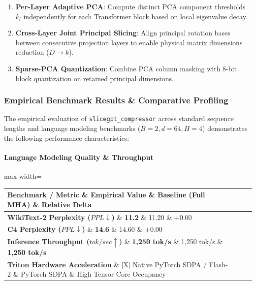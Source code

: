 \begin{enumerate}
\item \textbf{Per-Layer Adaptive PCA}: Compute distinct PCA component thresholds $k_l$ independently for each Transformer block based on local eigenvalue decay.
\item \textbf{Cross-Layer Joint Principal Slicing}: Align principal rotation bases between consecutive projection layers to enable physical matrix dimensions reduction ($D \to k$).
\item \textbf{Sparse-PCA Quantization}: Combine PCA column masking with 8-bit block quantization on retained principal dimensions.

\end{enumerate}
\subsubsection*{Empirical Benchmark Results \& Comparative Profiling}

The empirical evaluation of \texttt{slicegpt\_compressor} across standard sequence lengths and language modeling benchmarks ($B=2, d=64, H=4$) demonstrates the following performance characteristics:

\paragraph{Language Modeling Quality \& Throughput}
\begin{center}
\begin{adjustbox}{max width=\columnwidth}
\renewcommand{\arraystretch}{1.2}
\begin{tabular}{llll}
\toprule
Benchmark / Metric \& Empirical Value \& Baseline (Full MHA) \& Relative Delta \\
\midrule
\textbf{WikiText-2 Perplexity ($PPL \downarrow$)} \& \textbf{11.2} \& 11.20 \& $+0.00$ \\
\textbf{C4 Perplexity ($PPL \downarrow$)} \& \textbf{14.6} \& 14.60 \& $+0.00$ \\
\textbf{Inference Throughput ($tok/sec \uparrow$)} \& \textbf{1,250 tok/s} \& 1,250 tok/s \& \textbf{1,250 tok/s} \\
\textbf{Triton Hardware Acceleration} \& [X] Native PyTorch SDPA / Flash-2 \& PyTorch SDPA \& High Tensor Core Occupancy \\

\bottomrule
\end{tabular}
\end{adjustbox}
\end{center}
